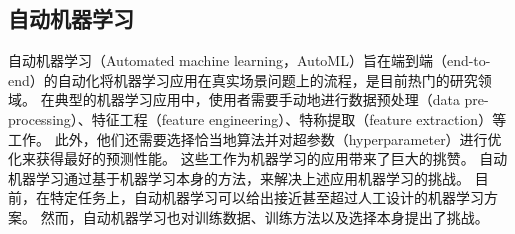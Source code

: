 


\subsection{自动机器学习}

自动机器学习（Automated machine learning，AutoML）旨在端到端（end-to-end）的自动化将机器学习应用在真实场景问题上的流程，是目前热门的研究领域\cite{feurer2015efficient, thornton2013auto, kotthoff2017auto}。
在典型的机器学习应用中，使用者需要手动地进行数据预处理（data pre-processing）、特征工程（feature engineering）、特称提取（feature extraction）等工作\cite{heaton2016empirical, nargesian2017learning}。
此外，他们还需要选择恰当地算法并对超参数（hyperparameter）进行优化来获得最好的{\model}预测性能\cite{snoek2012practical, brochu2010tutorial}。
这些工作为机器学习的应用带来了巨大的挑赞。
自动机器学习通过基于机器学习本身的方法，来解决上述应用机器学习的挑战。
目前，在特定任务上，自动机器学习可以给出接近甚至超过人工设计的机器学习方案。
然而，自动机器学习也对训练数据、训练方法以及{\model}选择本身提出了挑战。

